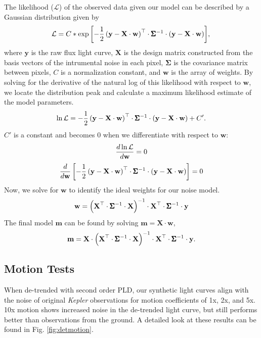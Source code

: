 \documentclass[12pt,preprint]{aastex}
\begin{document}
The likelihood ($\mathcal{L}$) of the observed data given our model can be described by a Gaussian distribution given by
%
\[
\mathcal{L} = C * \exp{\left[- \frac{1}{2}\left(\textbf{y} - \textbf{X}\cdot\textbf{w} \right)^\top \cdot \pmb{\Sigma}^{-1} \cdot \left(\textbf{y} - \textbf{X}\cdot\textbf{w} \right) \right]}, \\
\]
%
where $\textbf{y}$ is the raw flux light curve, $\textbf{X}$ is the design matrix constructed from the basis vectors of the intrumental noise in each pixel, $\pmb{\Sigma}$ is the covariance matrix between pixels, $C$ is a normalization constant, and $\textbf{w}$ is the array of weights. By solving for the derivative of the natural log of this likelihood with respect to $\textbf{w}$, we locate the distribution peak and calculate a maximum likelihood estimate of the model parameters.
%
\[
\ln{\mathcal{L}} = - \frac{1}{2}\left(\textbf{y} - \textbf{X}\cdot\textbf{w} \right)^\top \cdot \pmb{\Sigma}^{-1} \cdot \left(\textbf{y} - \textbf{X}\cdot\textbf{w} \right) + C'. \\
\]
%
$C'$ is a constant and becomes $0$ when we differentiate with respect to $\textbf{w}$:
\[
\frac{d\ln{\mathcal{L}}}{d \textbf{w}} = 0 \\
\]
%
\[
\frac{d}{d \textbf{w}} \left[ - \frac{1}{2} \left(\textbf{y} - \textbf{X}\cdot\textbf{w} \right)^\top \cdot \pmb{\Sigma}^{-1} \cdot \left(\textbf{y} - \textbf{X}\cdot\textbf{w} \right) \right] = 0 \\
\]
%
Now, we solve for $\textbf{w}$ to identify the ideal weights for our noise model.
%
\[
\textbf{w} = \left( \textbf{X}^\top \cdot \pmb{\Sigma}^{-1} \cdot \textbf{X} \right)^{-1} \cdot \textbf{X}^\top \cdot \pmb{\Sigma}^{-1} \cdot \textbf{y} \\
\]
%
The final model $\textbf{m}$ can be found by solving $\textbf{m} = \textbf{X} \cdot \textbf{w}$,
%
\[
\textbf{m} = \textbf{X} \cdot \left( \textbf{X}^\top \cdot \pmb{\Sigma}^{-1} \cdot \textbf{X} \right)^{-1} \cdot \textbf{X}^\top \cdot \pmb{\Sigma}^{-1} \cdot \textbf{y}. \\
\]
%

\subsection{Motion Tests}

When de-trended with second order PLD, our synthetic light curves align with the noise of original \textit{Kepler} observations for motion coefficients of 1x, 2x, and 5x. 10x motion shows increased noise in the de-trended light curve, but still performs better than observations from the ground. A detailed look at these results can be found in Fig. \ref{fig:detmotion}.
\end{document}
